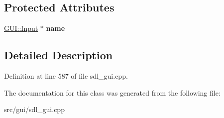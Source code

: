 \subsection*{Protected Attributes}
\begin{DoxyCompactItemize}
\item 
\hypertarget{classSaveLangDialog_aac396e13fdd8c3784b2c85e1d23adcd3}{\hyperlink{classGUI_1_1Input}{G\-U\-I\-::\-Input} $\ast$ {\bfseries name}}\label{classSaveLangDialog_aac396e13fdd8c3784b2c85e1d23adcd3}

\end{DoxyCompactItemize}


\subsection{Detailed Description}


Definition at line 587 of file sdl\-\_\-gui.\-cpp.



The documentation for this class was generated from the following file\-:\begin{DoxyCompactItemize}
\item 
src/gui/sdl\-\_\-gui.\-cpp\end{DoxyCompactItemize}
